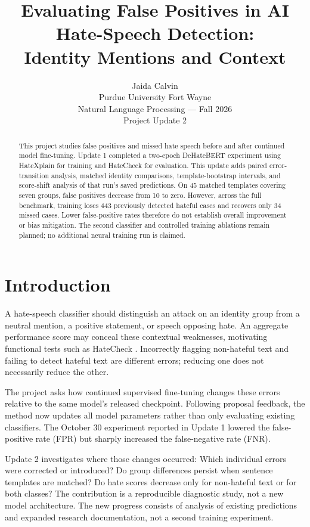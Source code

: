 \documentclass[11pt]{article}
\title{Evaluating False Positives in AI Hate-Speech Detection:\\Identity Mentions and Context}
\author{Jaida Calvin \\
Purdue University Fort Wayne \\
Natural Language Processing --- Fall 2026 \\
Project Update 2}
\date{}
\begin{document}
\maketitle
\begin{abstract}
This project studies false positives and missed hate speech before and after continued model fine-tuning. Update 1 completed a two-epoch DeHateBERT experiment using HateXplain for training and HateCheck for evaluation. This update adds paired error-transition analysis, matched identity comparisons, template-bootstrap intervals, and score-shift analysis of that run's saved predictions. On 45 matched templates covering seven groups, false positives decrease from 10 to zero. However, across the full benchmark, training loses 443 previously detected hateful cases and recovers only 34 missed cases. Lower false-positive rates therefore do not establish overall improvement or bias mitigation. The second classifier and controlled training ablations remain planned; no additional neural training run is claimed.
\end{abstract}

\section{Introduction}
A hate-speech classifier should distinguish an attack on an identity group from a neutral mention, a positive statement, or speech opposing hate. An aggregate performance score may conceal these contextual weaknesses, motivating functional tests such as HateCheck \citep{rottger2021hatecheck}. Incorrectly flagging non-hateful text and failing to detect hateful text are different errors; reducing one does not necessarily reduce the other.

The project asks how continued supervised fine-tuning changes these errors relative to the same model's released checkpoint. Following proposal feedback, the method now updates all model parameters rather than only evaluating existing classifiers. The October 30 experiment reported in Update 1 lowered the false-positive rate (FPR) but sharply increased the false-negative rate (FNR).

Update 2 investigates where those changes occurred: Which individual errors were corrected or introduced? Do group differences persist when sentence templates are matched? Do hate scores decrease only for non-hateful text or for both classes? The contribution is a reproducible diagnostic study, not a new model architecture. The new progress consists of analysis of existing predictions and expanded research documentation, not a second training experiment.
\end{document}
